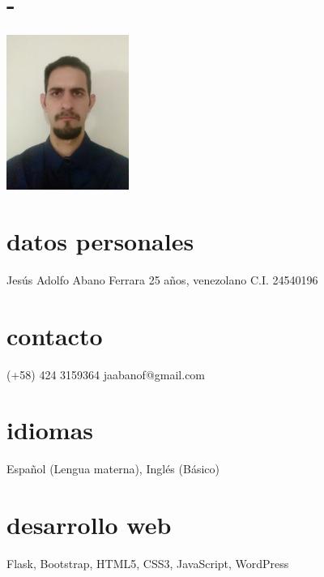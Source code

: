 \documentclass[espanol]{cv-style}     %
\begin{document}
\lastupdated

\begin{aside}
\section{-}
\includegraphics[width=4cm]{image/Perfil2020.png}
%
\section{datos personales}
Jesús Adolfo Abano Ferrara
25 años, venezolano
C.I. 24540196
%
\section{contacto}
(+58) 424 3159364
jaabanof@gmail.com
%
\section{idiomas}
Español (Lengua materna),
Inglés (Básico)
%
\section{desarrollo web}
Flask, Bootstrap, HTML5, CSS3, JavaScript, WordPress
%
\end{aside}
\vspace{0.2cm}
\end{document}
